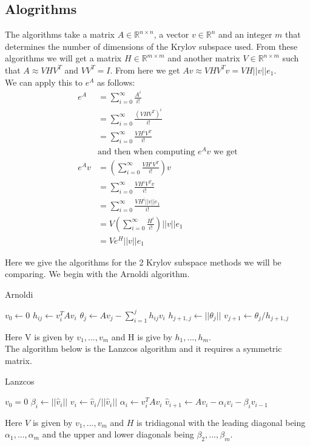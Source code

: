 \documentclass{article}
\begin{document}
\subsection{Alogrithms}
The algorithms take a matrix $A\in \mathbb{R}^{n\times n}$, a vector $v \in \mathbb{R}^n$ and an integer $m$ that determines the number of dimensions of the Krylov subspace used.
From these algorithms we will get a matrix $H \in \mathbb{R}^{m\times m}$ and another matrix $V \in \mathbb{R}^{n\times m}$ such that $A \approx VHV^T$ and $VV^T = I$.
From here we get $Av \approx VHV^Tv = VH||v||e_1$.\\
We can apply this to $e^A$ as follows:
\begin{align*}
e^A &= \sum^{\infty}_{i=0}\frac{A^i}{i!}\\
&= \sum^{\infty}_{i=0}\frac{(VHV^T)^i}{i!} \\
&= \sum^{\infty}_{i=0}\frac{VH^iV^T}{i!} \\
&\text {and then when computing $e^Av$ we get}\\
e^Av &= (\sum^{\infty}_{i=0}\frac{VH^iV^T}{i!})v \\
&= \sum^{\infty}_{i=0}\frac{VH^iV^Tv}{i!} \\
&= \sum^{\infty}_{i=0}\frac{VH^i||v||e_1}{i!} \\
&= V(\sum^{\infty}_{i=0}\frac{H^i}{i!})||v||e_1 \\
&= Ve^H||v||e_1
\end{align*}

Here we give the algorithms for the 2 Krylov subspace methods we will be comparing.
We begin with the Arnoldi algorithm.


\begin{algorithm}[H]
\caption{Arnoldi \cite{Fan2018}} %
\begin{algorithmic}
\State $v_0 \gets 0$
\State$h_{ij} \gets v_i^T A v_i$
\EndFor
\State$\theta_j \gets Av_j - \sum^j_{i=1} h_{ij}v_i$
\State$h_{j+1,j} \gets ||\theta_j||$
\State$v_{j+1} \gets \theta_j/h_{j+1,j}$
\EndFor
\EndProcedure
\end{algorithmic}
\end{algorithm}
Here V is given by $v_1,...,v_m$ and H is give by $h_1,...,h_m$.\\
The algorithm below is the Lanzcos algorithm and it requires a symmetric matrix. \cite{Moler2003}
\begin{algorithm}[H]
\caption{Lanzcos\cite{OJALVO1970}}
\begin{algorithmic}
\State $v_0 = 0$
\State$\beta_i \gets || \hat v_i ||$
\State$v_i \gets \hat v_i / || \hat v_i ||$
\State$\alpha_i \gets v_i^T A v_i$
\State$\hat v_{i+1} \gets Av_i - \alpha_iv_i - \beta_iv_{i-1}$
\EndFor
\EndProcedure
\end{algorithmic}
\end{algorithm}
Here $V$ is given by ${v_1,...,v_m}$ and $H$ is tridiagonal with the leading diagonal being $\alpha_1, ..., \alpha_m$ and the upper and lower diagonals being $\beta_2,...,\beta_m$.
\end{document}
